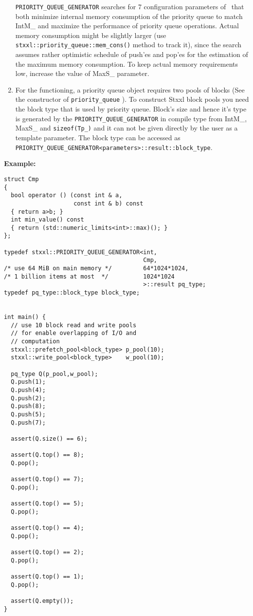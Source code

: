 \documentclass[twoside]{book}
\newcommand{\stxxl}{{\sc Stxxl} }
\begin{document}
\begin{enumerate}
\texttt{PRIORITY\_QUEUE\_GENERATOR} searches for 7 
configuration parameters of \xpqueue\ that both minimize
internal memory consumption of the priority queue to match IntM\_ and
maximize the performance of priority queue operations. Actual memory
consumption might be slightly larger (use
\texttt{stxxl::priority\_queue::mem\_cons()}
method to track it), since the search assumes rather optimistic
schedule of push'es and pop'es for the estimation of the maximum
memory consumption. To keep actual memory requirements low, increase
the value of MaxS\_ parameter. 
\item 
For the functioning, a priority queue object requires two pools of blocks
(See the constructor of \texttt{priority\_queue} ). To construct
\stxxl block pools 
you need the block type that is used by priority queue. Block's size
and hence it's type is generated by the 
\texttt{PRIORITY\_QUEUE\_GENERATOR} in compile type from IntM\_, MaxS\_
and \texttt{sizeof(Tp\_)} and it can not be given directly by the user
as a template parameter. The block type can be accessed as\\
\texttt{PRIORITY\_QUEUE\_GENERATOR<parameters>::result::block\_type}. 

\end{enumerate}

{\bf Example:}
\begin{lstlisting}
struct Cmp
{
  bool operator () (const int & a, 
                    const int & b) const 
  { return a>b; }
  int min_value() const  
  { return (std::numeric_limits<int>::max)(); }
};

typedef stxxl::PRIORITY_QUEUE_GENERATOR<int,
                                        Cmp,
/* use 64 MiB on main memory */         64*1024*1024,
/* 1 billion items at most  */          1024*1024
                                        >::result pq_type;
typedef pq_type::block_type block_type;


int main() {
  // use 10 block read and write pools 
  // for enable overlapping of I/O and
  // computation
  stxxl::prefetch_pool<block_type> p_pool(10);
  stxxl::write_pool<block_type>    w_pool(10);

  pq_type Q(p_pool,w_pool);
  Q.push(1);
  Q.push(4);
  Q.push(2);
  Q.push(8);
  Q.push(5);
  Q.push(7);
  
  assert(Q.size() == 6);

  assert(Q.top() == 8);
  Q.pop();

  assert(Q.top() == 7);
  Q.pop();

  assert(Q.top() == 5);
  Q.pop();

  assert(Q.top() == 4);
  Q.pop();

  assert(Q.top() == 2);
  Q.pop();

  assert(Q.top() == 1);
  Q.pop();

  assert(Q.empty());
}


\end{lstlisting}
\end{document}
